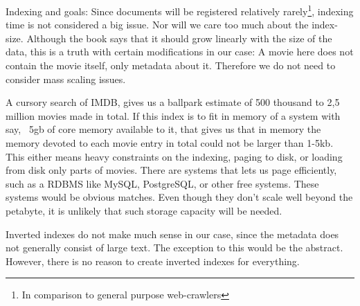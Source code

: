 Indexing and goals:
Since documents will be registered relatively rarely\footnote{In comparison to general purpose web-crawlers}, indexing time is not considered a big issue.
Nor will we care too much about the index-size. Although the book says that it should grow linearly with the size of the data, this is a truth with certain modifications in our case: A movie here does not contain the movie itself, only metadata about it. Therefore we do not need to consider mass scaling issues.

A cursory search of IMDB, gives us a ballpark estimate of 500 thousand to 2,5 million movies made in total. If this index is to fit in memory of a system with say, ~5gb of core memory available to it, that gives us that in memory the memory devoted to each movie entry in total could not be larger than 1-5kb. This either means heavy constraints on the indexing, paging to disk, or loading from disk only parts of movies. There are systems that lets us page efficiently, such as a RDBMS like MySQL, PostgreSQL, or other free systems. These systems would be obvious matches. Even though they don't scale well beyond the petabyte, it is unlikely that such storage capacity will be needed.

Inverted indexes do not make much sense in our case, since the metadata does not generally consist of large text. The exception to this would be the abstract. However, there is no reason to create inverted indexes for everything.

